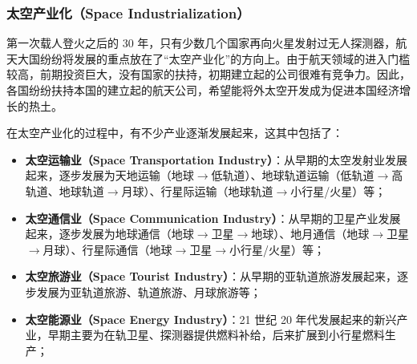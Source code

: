 \documentclass[letterpaper,10pt]{sphinxmanual}
\begin{document}

\subsubsection{太空产业化（Space Industrialization）}
\label{history:space-industrialization}\label{history:index-3}
第一次载人登火之后的 30 年，只有少数几个国家再向火星发射过无人探测器，航天大国纷纷将发展的重点放在了“太空产业化”的方向上。由于航天领域的进入门槛较高，前期投资巨大，没有国家的扶持，初期建立起的公司很难有竞争力。因此，各国纷纷扶持本国的建立起的航天公司，希望能将外太空开发成为促进本国经济增长的热土。

在太空产业化的过程中，有不少产业逐渐发展起来，这其中包括了：

\begin{itemize}
\item {} 
\textbf{太空运输业（Space Transportation Industry）}：从早期的太空发射业发展起来，逐步发展为天地运输（地球\(\rightarrow\)低轨道）、地球轨道运输（低轨道\(\rightarrow\)高轨道、地球轨道\(\rightarrow\)月球）、行星际运输（地球轨道\(\rightarrow\)小行星/火星）等；

\end{itemize}

\begin{itemize}
\item {} 
\textbf{太空通信业（Space Communication Industry）}：从早期的卫星产业发展起来，逐步发展为地球通信（地球\(\rightarrow\)卫星\(\rightarrow\)地球）、地月通信（地球\(\rightarrow\)卫星\(\rightarrow\)月球）、行星际通信（地球\(\rightarrow\)卫星\(\rightarrow\)小行星/火星）等；

\end{itemize}
\begin{figure}[htbp]
\centering
\end{figure}

\begin{itemize}
\item {} 
\textbf{太空旅游业（Space Tourist Industry）}：从早期的亚轨道旅游发展起来，逐步发展为亚轨道旅游、轨道旅游、月球旅游等；

\end{itemize}

\begin{itemize}
\item {} 
\textbf{太空能源业（Space Energy Industry）}：21 世纪 20 年代发展起来的新兴产业，早期主要为在轨卫星、探测器提供燃料补给，后来扩展到小行星燃料生产；

\end{itemize}
\begin{figure}[htbp]
\centering
\end{figure}
\end{document}
